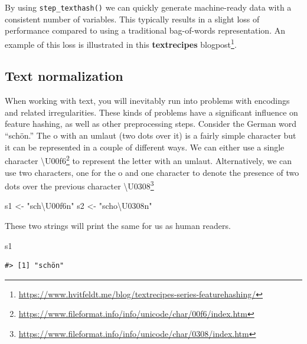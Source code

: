 \documentclass[
]{krantz}
\makeatletter
\newenvironment{Shaded}{\begin{snugshade}}{\end{snugshade}}
\newcommand{\NormalTok}[1]{#1}
\newcommand{\OtherTok}[1]{\textcolor[rgb]{0.56,0.35,0.01}{#1}}
\newcommand{\StringTok}[1]{\textcolor[rgb]{0.31,0.60,0.02}{#1}}
\DeclareRobustCommand{\href}[2]{#2\footnote{\url{#1}}}
\renewcommand{\href}[2]{#2\footnote{\url{#1}}}
\newenvironment{kframe}{%
\medskip{}
\setlength{\fboxsep}{.8em}
 \def\at@end@of@kframe{}%
 \ifinner\ifhmode%
  \def\at@end@of@kframe{\end{minipage}}%
  \begin{minipage}{\columnwidth}%
 \fi\fi%
 \def\FrameCommand##1{\hskip\@totalleftmargin \hskip-\fboxsep
 \colorbox{shadecolor}{##1}\hskip-\fboxsep
     \hskip-\linewidth \hskip-\@totalleftmargin \hskip\columnwidth}%
 \MakeFramed {\advance\hsize-\width
   \@totalleftmargin\z@ \linewidth\hsize
   \@setminipage}}%
 {\par\unskip\endMakeFramed%
 \at@end@of@kframe}
\renewenvironment{Shaded}{\begin{kframe}}{\end{kframe}}
\makeatother
\begin{document}
By using \texttt{step\_texthash()} we can quickly generate machine-ready data with a consistent number of variables.
This typically results in a slight loss of performance compared to using a traditional bag-of-words representation. An example of this loss is illustrated in this \href{https://www.hvitfeldt.me/blog/textrecipes-series-featurehashing/}{\textbf{textrecipes} blogpost}.

\hypertarget{text-normalization}{%
\subsection{Text normalization}\label{text-normalization}}

When working with text, you will inevitably run into problems with encodings and related irregularities.
These kinds of problems have a significant influence on feature hashing, as well as other preprocessing steps.
Consider the German word ``schön.''
The o with an umlaut (two dots over it) is a fairly simple character but it can be represented in a couple of different ways.
We can either use a single character \href{https://www.fileformat.info/info/unicode/char/00f6/index.htm}{\textbackslash U00f6} to represent the letter with an umlaut.
Alternatively, we can use two characters, one for the o and one character to denote the presence of two dots over the previous character \href{https://www.fileformat.info/info/unicode/char/0308/index.htm}{\textbackslash U0308}

\begin{Shaded}
\begin{Highlighting}[]
\NormalTok{s1 }\OtherTok{\textless{}{-}} \StringTok{"sch\textbackslash{}U00f6n"}
\NormalTok{s2 }\OtherTok{\textless{}{-}} \StringTok{"scho\textbackslash{}U0308n"}
\end{Highlighting}
\end{Shaded}

These two strings will print the same for us as human readers.

\begin{Shaded}
\begin{Highlighting}[]
\NormalTok{s1}
\end{Highlighting}
\end{Shaded}

\begin{verbatim}
#> [1] "schön"
\end{verbatim}
\end{document}
